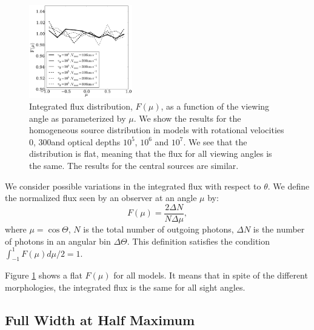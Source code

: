 \documentclass{emulateapj}
\newcommand{\kms}{{\ifmmode{{\mathrm{\,km\ s}^{-1}}}\else{\,km~s$^{-1}$}\fi}}
\begin{document}
\begin{figure}
\begin{center}
  \includegraphics[width=0.4\textwidth]{f5.pdf}
\end{center}
\caption{Integrated flux distribution, $F(\mu)$, as a function of the
  viewing angle as parameterized by $\mu$. We show the results for the
  homogeneous source distribution in models with rotational velocities
  $0$\kms, $300$\kms and  optical depths $10^5$, $10^6$ and $10^7$. We
  see that the distribution is flat, meaning that the flux for all
  viewing angles is the same. The results for the central sources are
  similar. 
\label{fig:muhisto}}
\end{figure}

We consider possible variations in the integrated flux with respect to
$\theta$. We define the normalized flux seen by an observer at an
angle $\mu$ by: \begin{equation}
F(\mu) = \frac{2\Delta N}{N\Delta \mu}, 
\end{equation} 
%
where $\mu=\cos\Theta$, $N$ is the total number of outgoing photons,
$\Delta N$ is the number of photons in an angular bin $\Delta
\Theta$. This definition satisfies the condition
$\int_{-1}^{1}F(\mu)d\mu/2=1$. 

Figure \ref{fig:muhisto} shows a flat $F(\mu)$ for all models. It
means that in spite of the different morphologies, the integrated flux
is the same for all sight angles.  
	

\subsection{Full Width at Half Maximum}
\label{sec:widthpeak}
\end{document}
